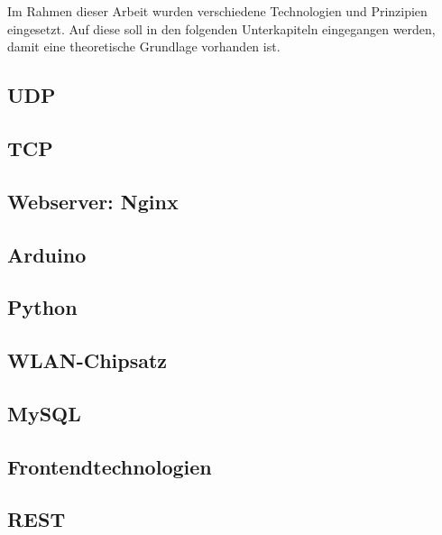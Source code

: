 
Im Rahmen dieser Arbeit wurden verschiedene Technologien und Prinzipien eingesetzt. Auf diese soll in den folgenden Unterkapiteln eingegangen werden, damit eine theoretische Grundlage vorhanden ist. 

\subsection{\ac{UDP}}
\label{sec:UDP-1}



\subsection{\ac{TCP}}
\label{sec:TCP-1}



\subsection{Webserver: Nginx}
\label{sec:WebserverNginx-1} 


 
\subsection{Arduino}
\label{sec:Arduino-1} 



\subsection{Python}
\label{src:Python-1}



\subsection{WLAN-Chipsatz}
\label{sec:WLAN-CHipsatz-1} 

\subsection{MySQL}
\label{sec:MySQL-1}
 
\subsection{Frontendtechnologien}
\label{sec:Frontendtechnologien-1}


 
 \newpage
 
\subsection{\ac{REST}}        
\label{sec:REST-1}  

\cite{Tilkov.2015}
  
\newpage